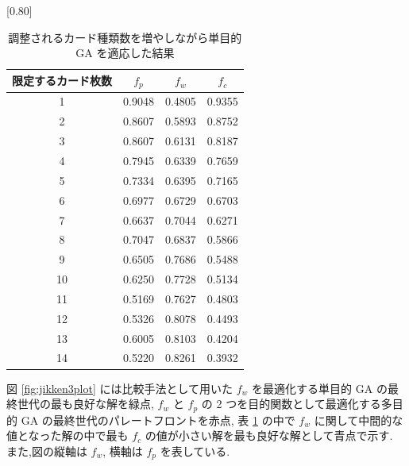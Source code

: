\documentclass[12pt]{jarticle}
\begin{document}
\begin{table}[t]
  \centering
  \caption{調整されるカード種類数を増やしながら単目的 GA を適応した結果}
  \label{jikken3result}
  \scalebox{0.80}[0.80]{
    \begin{tabular}{|c|c|c|c|}
      \hline
      限定するカード枚数     & $f_p$ & $f_w$ & $f_c$\\ \hline \hline
      1              & 0.9048         & 0.4805 & 0.9355  \\ \hline
      2           & 0.8607         & 0.5893 & 0.8752 \\ \hline
      3        & 0.8607         & 0.6131 & 0.8187  \\ \hline
      4    & 0.7945         & 0.6339 & 0.7659 \\ \hline
      5 & 0.7334         & 0.6395  & 0.7165 \\ \hline
      6 & 0.6977      & 0.6729  & 0.6703 \\ \hline
      7& 0.6637   & 0.7044  & 0.6271 \\ \hline
      8 & 0.7047 & 0.6837 & 0.5866 \\ \hline
      9 & 0.6505 & 0.7686 & 0.5488\\ \hline
      10 & 0.6250 & 0.7728  & 0.5134\\ \hline
      11 & 0.5169 & 0.7627 & 0.4803\\ \hline
      12 & 0.5326 & 0.8078 & 0.4493\\ \hline
      13 & 0.6005 & 0.8103 & 0.4204\\ \hline
      14 &  0.5220 &  0.8261 & 0.3932\\ \hline
      \end{tabular}
  }
  
  \end{table}
図 \ref{fig:jikken3plot} には比較手法として用いた $f_w$ を最適化する単目的 GA の最終世代の最も良好な解を緑点, $f_w$ と $f_p$ の 2 つを目的関数として最適化する多目的 GA の最終世代のパレートフロントを赤点, 表 \ref{jikken3result} の中で $f_w$ に関して中間的な値となった解の中で最も $f_c$ の値が小さい解を最も良好な解として青点で示す. 
また,図の縦軸は $f_w$, 横軸は $f_p$ を表している. 
\end{document}
